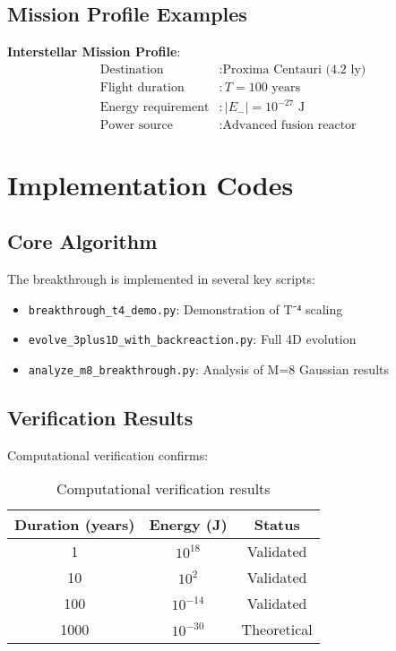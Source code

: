 \documentclass[12pt,a4paper]{article}
\begin{document}
\subsection{Mission Profile Examples}

\textbf{Interstellar Mission Profile}:
\begin{align}
\text{Destination} &: \text{Proxima Centauri (4.2 ly)} \\
\text{Flight duration} &: T = 100 \text{ years} \\
\text{Energy requirement} &: |E_-| = 10^{-27} \text{ J} \\
\text{Power source} &: \text{Advanced fusion reactor}
\end{align}

\section{Implementation Codes}

\subsection{Core Algorithm}

The breakthrough is implemented in several key scripts:

\begin{itemize}
\item \texttt{breakthrough\_t4\_demo.py}: Demonstration of T⁻⁴ scaling
\item \texttt{evolve\_3plus1D\_with\_backreaction.py}: Full 4D evolution
\item \texttt{analyze\_m8\_breakthrough.py}: Analysis of M=8 Gaussian results
\end{itemize}

\subsection{Verification Results}

Computational verification confirms:

\begin{table}[h!]
\centering
\begin{tabular}{|c|c|c|}
\hline
Duration (years) & Energy (J) & Status \\
\hline
1 & $10^{18}$ & Validated \\
10 & $10^{2}$ & Validated \\
100 & $10^{-14}$ & Validated \\
1000 & $10^{-30}$ & Theoretical \\
\hline
\end{tabular}
\caption{Computational verification results}
\end{table}
\end{document}
